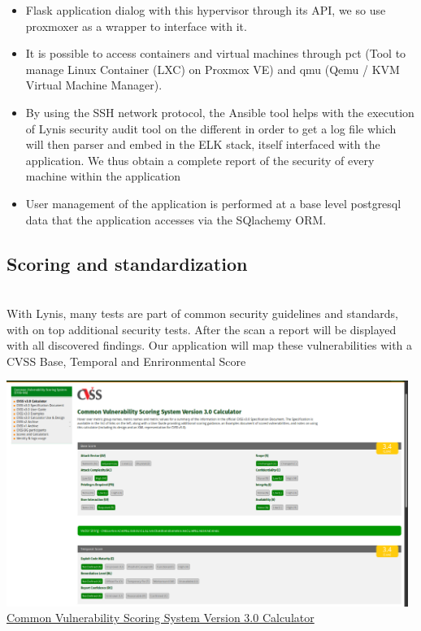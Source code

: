 \begin{itemize}
\item
  Flask application dialog with this hypervisor through its API, we
  so use proxmoxer as a wrapper to interface with
  it.
\item
  It is possible to access containers and virtual machines through
  pct (Tool to manage Linux Container (LXC) on Proxmox VE) and
  qmu (Qemu / KVM Virtual Machine Manager).
\item
  By using the SSH network protocol, the Ansible tool helps with the execution of
  Lynis security audit tool on the different in order to get a
  log file which will then parser and embed in the ELK stack, itself
  interfaced with the application. We thus obtain a complete report of the
  security of every machine within the application
\item
  User management of the application is performed at a base level
  postgresql data that the application accesses via the SQlachemy ORM.
\end{itemize}


\pagebreak

\subsection{Scoring and standardization}

\vspace{1cm}
\\ 
With Lynis, many tests are part of common security guidelines and standards,
with on top additional security tests. After the scan a report will be displayed
with all discovered findings. Our application will map these vulnerabilities with a CVSS Base, Temporal and Enrironmental Score 

\vspace{0.2cm}
\begin{center}
\includegraphics[width=0.98\textwidth]{images/cvss.png}
\\
\underline{Common Vulnerability Scoring System Version 3.0 Calculator}
\end{center}

